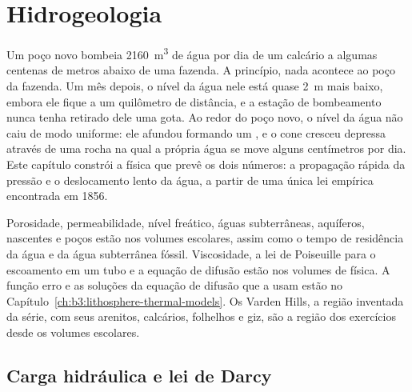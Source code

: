 \chapter{Hidrogeologia}\label{ch:b3:hydrogeology}

Um poço novo bombeia \qty{2160}{m^3} de água por dia de um calcário a algumas
centenas de metros abaixo de uma fazenda. A princípio, nada acontece ao poço da
fazenda. Um mês depois, o nível da água nele está quase \qty{2}{m} mais baixo, embora
ele fique a um quilômetro de distância, e a estação de bombeamento nunca tenha retirado dele uma gota.
Ao redor do poço novo, o nível da água não caiu de modo uniforme: ele afundou formando um
, e o cone cresceu depressa através de uma rocha na qual a própria água
se move alguns centímetros por dia. Este capítulo constrói a física que
prevê os dois números: a propagação rápida da pressão e o deslocamento lento
da água, a partir de uma única lei empírica encontrada em 1856.

\begin{recall}
Porosidade, permeabilidade, nível freático, águas subterrâneas, aquíferos, nascentes
e poços estão nos volumes escolares, assim como o tempo de residência da água e
da água subterrânea fóssil. Viscosidade, a lei de Poiseuille para o escoamento em um tubo e a
equação de difusão estão nos volumes de física. A função erro
e as soluções da equação de difusão que a usam estão no
Capítulo~\ref{ch:b3:lithosphere-thermal-models}. Os Varden Hills, a
região inventada da série, com seus arenitos, calcários, folhelhos e giz, são
a região dos exercícios desde os volumes escolares.
\end{recall}

\section{Carga hidráulica e lei de Darcy}\label{sec:b3:hydrogeology:darcy}

